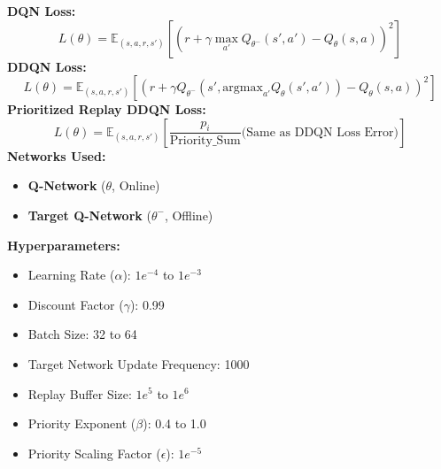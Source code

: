 \documentclass[a4paper,10pt]{article}
\begin{document}
\begin{multicols}{2}
\textbf{DQN Loss:}
\[
L(\theta) = \mathbb{E}_{(s, a, r, s')} \left[ \left( r + \gamma \max_{a'} Q_{\theta^-}(s', a') - Q_\theta(s, a) \right)^2 \right]
\]
\textbf{DDQN Loss:}
\[
L(\theta) = \mathbb{E}_{(s, a, r, s')} \left[ \left( r + \gamma Q_{\theta^-}(s', \text{argmax}_{a'} Q_\theta(s', a')) - Q_\theta(s, a) \right)^2 \right]
\]
\textbf{Prioritized Replay DDQN Loss:}
\[
L(\theta) = \mathbb{E}_{(s, a, r, s')} \left[ \frac{p_i}{\text{Priority\_Sum}} \text{(Same as DDQN Loss Error)} \right]
\]
\textbf{Networks Used:} 
\begin{itemize}
    \item \textbf{Q-Network} (\(\theta\), Online)
    \item \textbf{Target Q-Network} (\(\theta^-\), Offline)
\end{itemize}
\textbf{Hyperparameters:}
\begin{itemize}
    \item Learning Rate (\(\alpha\)): \(1e^{-4}\) to \(1e^{-3}\)
    \item Discount Factor (\(\gamma\)): 0.99
    \item Batch Size: 32 to 64
    \item Target Network Update Frequency: 1000
    \item Replay Buffer Size: \(1e^5\) to \(1e^6\)
    \item Priority Exponent (\(\beta\)): 0.4 to 1.0
    \item Priority Scaling Factor (\(\epsilon\)): \(1e^{-5}\)
\end{itemize}


\end{multicols}
\end{document}
